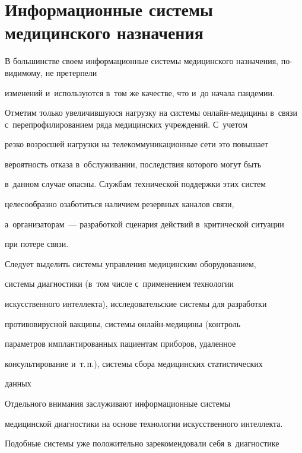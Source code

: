    


\section{Информационные системы медицинского назначения }





  В большинстве своем информационные системы медицинского назначения, по-ви\-ди\-мо\-му, не претерпели 


изменений и~используются в~том же качестве, что и~до начала пандемии. 


Отметим только увеличившуюся нагрузку на системы онлайн-медицины в~связи с~перепрофилированием ряда медицинских учреждений. С~учетом 


резко возросшей нагрузки на телекоммуникационные сети это повышает 


вероятность отказа в~обслуживании, последствия которого могут быть 


в~данном случае опасны. Службам технической поддержки этих систем 


целесообразно озаботиться наличием резервных каналов связи, 


а~организаторам~--- разработкой сценария действий в~критической ситуации 


при потере связи. 


  


  Следует выделить системы управления медицинским оборудованием, 


системы диагностики (в~том числе с~применением технологии 


искусственного интеллекта), исследовательские системы для разработки 


противовирусной вакцины, системы он\-лайн-ме\-ди\-ци\-ны (контроль 


параметров имплантированных пациентам приборов, удаленное 


консультирование и~т.\,п.), системы сбора медицинских статистических 


данных


  


  Отдельного внимания заслуживают информационные сис\-те\-мы 


медицинской диагностики на основе технологии искусственного интеллекта. 


Подобные сис\-те\-мы уже положительно зарекомендовали себя в~диагностике 


